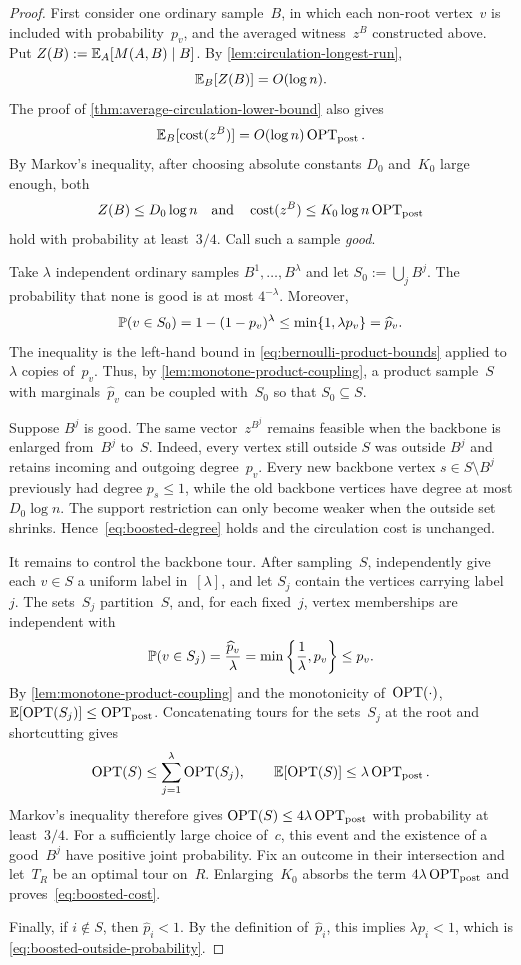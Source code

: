 \documentclass[12pt,a4paper,oneside]{report}
\begin{document}
\begin{proof}
First consider one ordinary sample~$B$, in which each non-root vertex~$v$ is included
with probability~$p_v$, and the averaged witness~$z^B$ constructed above.
Put $Z(B):=\E_A[M(A,B)\mid B]$.  By
\cref{lem:circulation-longest-run},
\[
    \E_B[Z(B)]=O(\log n).
\]
The proof of \cref{thm:average-circulation-lower-bound} also gives
\[
    \E_B[\cost(z^B)]
    =O(\log n)\optpost.
\]
By Markov's inequality, after choosing absolute constants
$D_0$ and~$K_0$
large enough, both
\[
    Z(B)\le D_0\log n
    \quad\text{and}\quad
    \cost(z^B)\le K_0\log n\optpost
\]
hold with probability at least~$3/4$.  Call such a sample \emph{good}.

Take $\lambda$ independent ordinary samples
$B^1,\ldots,B^\lambda$ and let $S_0:=\bigcup_jB^j$.  The probability that
none is good is at most $4^{-\lambda}$.  Moreover,
\[
    \P(v\in S_0)=1-(1-p_v)^\lambda
    \le\min\{1,\lambda p_v\}=\widehat p_v.
\]
The inequality is the left-hand bound in
\cref{eq:bernoulli-product-bounds} applied to $\lambda$ copies of~$p_v$.
Thus, by \cref{lem:monotone-product-coupling}, a product sample~$S$ with
marginals~$\widehat p_v$ can be coupled with~$S_0$ so that $S_0\subseteq S$.

Suppose $B^j$ is good.  The same vector~$z^{B^j}$ remains feasible when the
backbone is enlarged from~$B^j$ to~$S$.  Indeed, every vertex still outside
$S$ was outside $B^j$ and retains incoming and outgoing degree~$p_v$.
Every new backbone vertex $s\in S\setminus B^j$ previously had degree
$p_s\le1$, while the old backbone vertices have degree at most
$D_0\log n$.  The support restriction can only become weaker when the
outside set shrinks.  Hence~\cref{eq:boosted-degree} holds and the circulation
cost is unchanged.

It remains to control the backbone tour.  After sampling~$S$, independently
give each $v\in S$ a uniform label in~$[\lambda]$, and let $S_j$ contain the
vertices carrying label~$j$.  The sets~$S_j$ partition~$S$, and, for each
fixed~$j$, vertex memberships are independent with
\[
    \P(v\in S_j)=\frac{\widehat p_v}{\lambda}
    =\min\left\{\frac1\lambda,p_v\right\}
    \le p_v.
\]
By \cref{lem:monotone-product-coupling} and the monotonicity of~$\opt(\cdot)$,
$\E[\opt(S_j)]\le\optpost$.  Concatenating tours for
the sets~$S_j$ at the root and shortcutting gives
\[
    \opt(S)\le\sum_{j=1}^{\lambda}\opt(S_j),
    \qquad
    \E[\opt(S)]\le\lambda\optpost.
\]
Markov's inequality therefore gives
$\opt(S)\le4\lambda\optpost$ with probability at least~$3/4$.
For a sufficiently large choice of~$c$, this event and the existence of a
good~$B^j$ have positive joint probability.  Fix an outcome in their
intersection and let~$T_R$ be an optimal tour on~$R$.  Enlarging~$K_0$ absorbs
the term $4\lambda\optpost$ and proves~\cref{eq:boosted-cost}.

Finally, if $i\notin S$, then $\widehat p_i<1$.  By the definition of~$\widehat p_i$, this
implies $\lambda p_i<1$, which is
\cref{eq:boosted-outside-probability}.
\end{proof}
\end{document}
